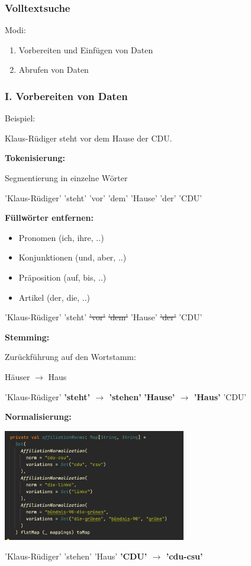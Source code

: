 \documentclass{beamer}
\begin{document}
\begin{frame}
  \frametitle{Volltextsuche}

  Modi:
  \begin{enumerate}[I]
    \item Vorbereiten und Einfügen von Daten
    \item Abrufen von Daten
  \end{enumerate}
\end{frame}

\begin{frame}[allowframebreaks]
  \frametitle{I. Vorbereiten von Daten}

  Beispiel:

  Klaus-Rüdiger steht vor dem Hause der CDU.

  \break

  \textbf{Tokenisierung:}

  Segmentierung in einzelne Wörter

  \bigskip
  'Klaus-Rüdiger' 'steht' 'vor' 'dem' 'Hause' 'der' 'CDU'

  \break

  \textbf{Füllwörter entfernen:}

  \begin{itemize}
    \item Pronomen (ich, ihre, ..)
    \item Konjunktionen (und, aber, ..)
    \item Präposition (auf, bis, ..)
    \item Artikel (der, die, ..)
  \end{itemize}

  \bigskip

  'Klaus-Rüdiger' 'steht' \sout{'vor'} \sout{'dem'} 'Hause' \sout{'der'} 'CDU'

  \break

  \textbf{Stemming:}

  \bigskip

  Zurückführung auf den Wortstamm:

  \medskip

  Häuser $\rightarrow$ Haus

  \bigskip
  'Klaus-Rüdiger' \textbf{'steht' $\rightarrow$ 'stehen'} \textbf{'Hause' $\rightarrow$ 'Haus'} 'CDU'

  \break

  \textbf{Normalisierung:}

  \includegraphics[width=8cm]{normalisierung}

  \bigskip
  'Klaus-Rüdiger' 'stehen' 'Haus' \textbf{'CDU' $\rightarrow$ 'cdu-csu'}
\end{frame}
\end{document}
